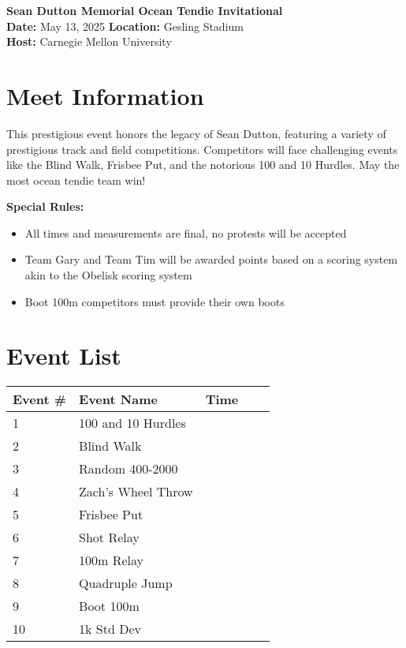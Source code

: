 \documentclass[10pt]{article}
\begin{document}
\begin{center}
    \LARGE \textbf{Sean Dutton Memorial Ocean Tendie Invitational} \\
    \large
    \vspace{0.5em}
    \textbf{Date:} May 13, 2025 \hspace{2cm} \textbf{Location:} Gesling Stadium \\
    \textbf{Host:} Carnegie Mellon University
\end{center}

\vspace{1em}

\section*{Meet Information}
This prestigious event honors the legacy of Sean Dutton, featuring a variety of prestigious track and field competitions. Competitors will face challenging events like the Blind Walk, Frisbee Put, and the notorious 100 and 10 Hurdles. May the most ocean tendie team win!
            
\textbf{Special Rules:}
\begin{itemize}
  \item All times and measurements are final, no protests will be accepted
  \item Team Gary and Team Tim will be awarded points based on a scoring system akin to the Obelisk scoring system
  \item Boot 100m competitors must provide their own boots
\end{itemize}


\vspace{1em}

\section*{Event List}

\begin{tabular}{@{}lllll@{}}
\toprule
\textbf{Event \#} & \textbf{Event Name} &  \textbf{Time} \\
\midrule
1 & 100 and 10 Hurdles &  \\
2 & Blind Walk &  \\
3 & Random 400-2000 &  \\
4 & Zach's Wheel Throw &  \\
5 & Frisbee Put &  \\
6 & Shot Relay &  \\
7 & 100m Relay &  \\
8 & Quadruple Jump &  \\
9 & Boot 100m &  \\
10 & 1k Std Dev &  \\
\bottomrule
\end{tabular}
\end{document}
